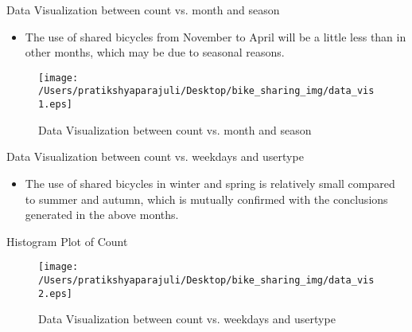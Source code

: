 \documentclass[
 size=14pt,
 paper=smartboard,  %
 mode=present, 		%
 display=slides, 	%
 style=tuliplab,  	%
 pauseslide,
 fleqn,leqno]{powerdot}
\begin{document}
  \begin{slide}[toc=,bm=]{ Data Visualization between count vs. month and season }

    \begin{itemize}
    \item The use of shared bicycles from November to April will be a little less than in other months, which may be due to seasonal reasons. 
    \end{itemize}
  
    \begin{figure}
      \centering
      \centerline{\texttt{[image: /Users/pratikshyaparajuli/Desktop/bike\_sharing\_img/data\_vis1.eps]}}
      \caption{Data Visualization between count vs. month and season}\label{fig:Data Visualization between count vs. month and season}
    \end{figure}
    \end{slide}
    \begin{slide}[toc=,bm=]{ Data Visualization between count vs. weekdays and usertype }

      \begin{itemize}
      \item The use of shared bicycles in winter and spring is relatively small compared to summer and autumn, which is mutually confirmed with the conclusions generated in the above months.
      \end{itemize}
      Histogram Plot of Count
      \begin{figure}
        \centering
        \centerline{\texttt{[image: /Users/pratikshyaparajuli/Desktop/bike\_sharing\_img/data\_vis2.eps]}}
        \caption{Data Visualization between count vs. weekdays and usertype}\label{fig:Data Visualization between count vs. weekdays and usertype}
      \end{figure}
      \end{slide}
\end{document}
